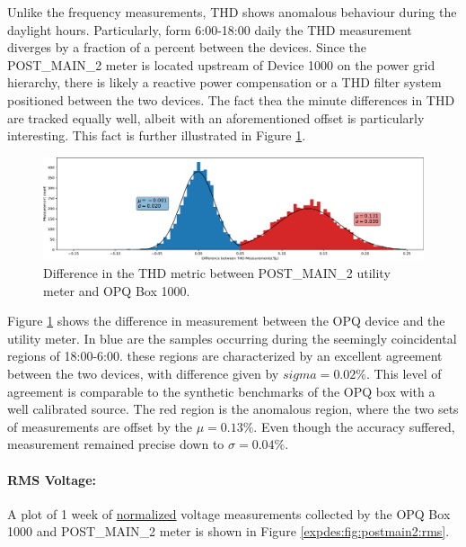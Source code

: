 Unlike the frequency measurements, THD shows anomalous behaviour during the daylight hours.
Particularly, form 6:00-18:00 daily the THD measurement diverges by a fraction of a percent between the devices.
Since the POST\_MAIN\_2 meter is located upstream of Device 1000 on the power grid hierarchy, there is likely a reactive power compensation or a THD filter system positioned between the two devices.
The fact thea the minute differences in THD are tracked equally well, albeit with an aforementioned offset is particularly interesting.
This fact is further illustrated in Figure \ref{expdes:fig:postmain2:thd_diff}.

\begin{figure}[ht!]
    \centering
    \includegraphics[width=1\linewidth]{img/napali_eval/gt/gt_thd_diff.pdf}
    \caption{Difference in the THD metric between POST\_MAIN\_2 utility meter and OPQ Box 1000.}
    \label{expdes:fig:postmain2:thd_diff}
\end{figure}

Figure \ref{expdes:fig:postmain2:thd_diff} shows the difference in measurement between the OPQ device and the utility meter.
In blue are the samples occurring during the seemingly coincidental regions of 18:00-6:00.
these regions are characterized by an excellent agreement between the two devices, with difference given by $sigma =0.02\%$.
This level of agreement is comparable to the synthetic benchmarks of the OPQ box with a well calibrated source.
The red region is the anomalous region, where the two sets of measurements are offset by the $\mu = 0.13\%$.
Even though the accuracy suffered, measurement remained precise down to $\sigma=0.04\%$.

\paragraph{RMS Voltage:}
A plot of 1 week of \underline{normalized} voltage measurements collected by the OPQ Box 1000 and POST\_MAIN\_2 meter is shown in Figure \ref{expdes:fig:postmain2:rms}.

